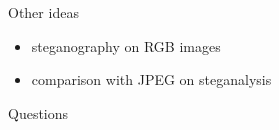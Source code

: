 \documentclass[11pt,compress]{beamer} %
\begin{document}
\begin{frame}{Other ideas}
  \begin{itemize}
    \item steganography on RGB images
    \item comparison with JPEG on steganalysis
  \end{itemize}
\end{frame}

\begin{frame}
  \centering
  Questions
\end{frame}
\end{document}
